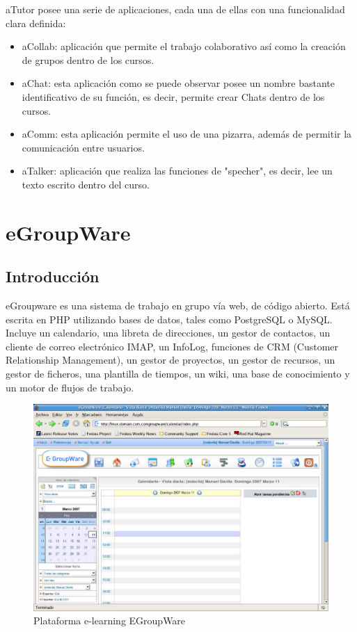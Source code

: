 aTutor posee una serie de aplicaciones, cada una de ellas con una funcionalidad clara definida:

\begin{itemize}
	\item aCollab: aplicación que permite el trabajo colaborativo así como la creación de grupos dentro de los cursos.
	\item aChat: esta aplicación como se puede observar posee un nombre bastante identificativo de su función, es decir, permite crear Chats dentro de los cursos.
	\item aComm: esta aplicación permite el uso de una pizarra, además de permitir la comunicación entre usuarios.
	\item aTalker: aplicación que realiza las funciones de "specher", es decir, lee un texto escrito dentro del curso.
\end{itemize}

\section{eGroupWare}

\subsection{Introducción}

eGroupware\cite{egroupware} es una sistema de trabajo en grupo vía web, de código abierto. Está escrita en PHP utilizando bases de datos, tales como PostgreSQL o MySQL. Incluye un calendario, una libreta de direcciones, un gestor de contactos, un cliente de correo electrónico IMAP, un InfoLog, funciones de CRM (Customer Relationship Management), un gestor de proyectos, un gestor de recursos, un gestor de ficheros, una plantilla de tiempos, un wiki, una base de conocimiento y un motor de flujos de trabajo.

\begin{figure}[h]
	\includegraphics[width=\textwidth]{./img/c2-egroupware.eps}
	\caption{Plataforma e-learning EGroupWare}
\end{figure}

